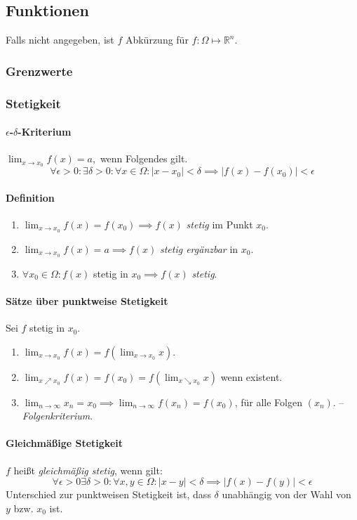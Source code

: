 \documentclass[a4paper, 9pt, DIV=24]{scrartcl}
\newcommand{\R}{\mathbb{R}}
\begin{document}
\subsection{Funktionen}
Falls nicht angegeben, ist $f$ Abkürzung für $f: \Omega \mapsto \R^n$.
\subsubsection{Grenzwerte}
\subsubsection{Stetigkeit}
\paragraph{$\epsilon$-$\delta$-Kriterium} $\lim_{x\rightarrow x_0} f(x) = a, $ wenn Folgendes gilt.
\[\forall\epsilon>0:\exists\delta>0: \forall x \in \Omega: |x-x_0| < \delta \implies |f(x) - f(x_0)| < \epsilon \]
\paragraph{Definition}
\begin{enumerate}[label={(}\arabic*{)}]
 \item $\lim_{x\rightarrow x_0} f(x) = f(x_0) \implies f(x)$ \emph{stetig} im Punkt $x_0$.
 \item $\lim_{x\rightarrow x_0} f(x) = a \implies f(x)$ \emph{stetig ergänzbar} in $x_0$.
 \item $\forall x_0\in\Omega: f(x) $ stetig in $x_0 \implies f(x)$ \emph{stetig}.
\end{enumerate}

\paragraph{Sätze über punktweise Stetigkeit}
Sei $f$ stetig in $x_0$.
\begin{enumerate}[label={(}\arabic*{)}]
 \item $\lim_{x\rightarrow x_0} f(x) = f(\lim_{x\rightarrow x_0} x)$.
 \item $\lim_{x\nearrow x_0} f(x) = f(x_0) = f(\lim_{x\searrow x_0} x)$ wenn existent.
 \item $\lim_{n\rightarrow \infty} x_n = x_0 \implies \lim_{n\rightarrow \infty} f(x_n) = f(x_0)$, für alle Folgen $(x_n)$. -- \emph{Folgenkriterium}.
\end{enumerate}

\paragraph{Gleichmäßige Stetigkeit}
$f$ heißt \emph{gleichmäßig stetig}, wenn gilt:
\[\forall\epsilon>0\exists\delta>0: \forall x,y \in \Omega: |x-y| < \delta \implies |f(x) - f(y)| < \epsilon \]
Unterschied zur punktweisen Stetigkeit ist, dass $\delta$ unabhängig von der Wahl von $y$ bzw. $x_0$ ist.
\end{document}
